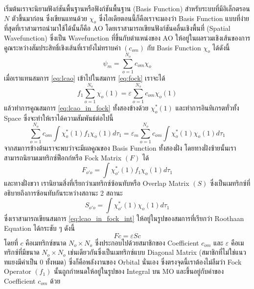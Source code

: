 เริ่มต้นเราจะนิยามฟังก์ชันพื้นฐานหรือฟังก์ชันพื้นฐาน (Basis Function) สำหรับระบบที่มีอิเล็กตรอน $N$ ตัวขึ้นมาก่อน ซึ่งเขียนแทนด้วย $\chi_{o}$ ซึ่งไอเดียตอนนี้ก็คือเราจะมองว่า Basis Function แบบที่ง่ายที่สุดที่เราสามารถนำมาใช้ได้นั้นก็คือ AO โดยเราสามารถเขียนฟังก์ชันคลื่นเชิงพื้นที่ (Spatial Wavefunction) ซึ่งเป็น Wavefunction ที่ขึ้นกับตำแหน่งของ AO ให้อยู่ในผลรวมเชิงเส้นของการคูณระหว่างสัมประสิทธิ์เชิงเส้นที่เรายังไม่ทราบค่า $(c_{om})$ กับ Basis Function $\chi_{o}$ ได้ดังนี้
%
\begin{equation}\label{eq:lcao}
    \psi_{m} = \sum^{N_{o}}_{o=1} c_{om} \chi_{o}
\end{equation}
%
\noindent เมื่อเราแทนสมการ \eqref{eq:lcao} เข้าไปในสมการ \eqref{eq:fock} เราจะได้
%
\begin{equation}\label{eq:lcao_in_fock}
    f_{1} \sum^{N_{o}}_{o=1} \chi_{o}(1) = \varepsilon \sum^{N_{o}}_{o=1} c_{om} \chi_{o}(1)
\end{equation}
%
\noindent แล้วทำการคูณสมการ \eqref{eq:lcao_in_fock} ทั้งสองข้างด้วย $\chi^{*}_{o}(1)$ และทำการอินทิเกรตทั่วทั้ง Space ซึ่งจะทำให้เราได้ความสัมพันธ์ต่อไปนี้
%
\begin{equation}\label{eq:lcao_in_fock_int}
    \sum^{N_{o}}_{o=1} c_{om} \int \chi^{*}_{o}(1) f_{1} \chi_{o}(1) d\tau_{1} =
    \varepsilon_{m} \sum^{N_{o}}_{o=1} c_{om} \int \chi^{*}_{o}(1) \chi_{o}(1) d\tau_{1}
\end{equation}
%
\noindent จากสมการข้างต้นเราจะพบว่าจะมีผลคูณของ Basis Function ทั้งสองฝั่ง โดยทางฝั่งซ้ายนั้นเราสามารถนิยามเมทริกซ์ฟ็อกก์หรือ Fock Matrix $(F)$ ได้
%
\begin{equation}\label{eq:matrix_fock}
    F_{o'o} = \int \chi^{*}_{o'}(1) f_{1} \chi_{o}(1) d\tau_{1}
\end{equation}
%
\noindent และทางฝั่งขวา เรานิยามสิ่งที่เรียกว่าเมทริกซ์ซ้อนทับหรือ Overlap Matrix $(S)$ ซึ่งเป็นเมทริกซ์ที่อธิบายถึงการซ้อนทับกันระหว่างสถานะ 2 สถานะ
%
\begin{equation}\label{eq:matrix_overlap}
    S_{o'o} = \int \chi^{*}_{o'}(1) \chi_{o}(1) d\tau_{1}
\end{equation}
%
\noindent ซึ่งเราสามารถเขียนสมการ \eqref{eq:lcao_in_fock_int} ให้อยู่ในรูปของสมการที่เรียกว่า Roothaan Equation ได้กระชับ ๆ ดังนี้
%
\begin{equation}\label{eq:roothaan}
    F c = \varepsilon S c
\end{equation}
%
\noindent โดยที่ $c$ คือเมทริกซ์ขนาด $N_{o} \times N_{o}$ ซึ่งประกอบไปด้วยสมาชิกของ Coefficient $c_{om}$ และ $\varepsilon$ คือเมทริกซ์ที่มีขนาด $N_{o} \times N_{o}$ เช่นเดียวกันซึ่งเป็นเมทริกซ์แบบ Diagonal Matrix (สมาชิกที่ไม่ใช่แนวทแยงมีค่าเป็น 0 ทั้งหมด) ซึ่งก็คือพลังงานของ Orbital นั่นเอง ซึ่งตรงจุดนี้เราต้องไม่ลืมว่า Fock Operator $(f_{1})$ นั้นถูกกำหนดให้อยู่ในรูปของ Integral บน MO และขึ้นอยู่กับค่าของ Coefficient $c_{om}$ ด้วย

